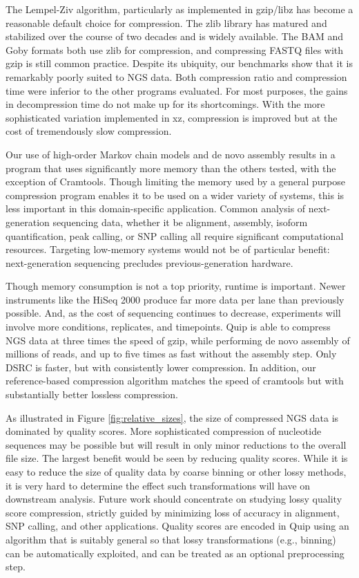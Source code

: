 \documentclass[a4,center,fleqn]{NAR}
\begin{document}
The Lempel-Ziv algorithm, particularly as implemented in gzip/libz has become
a reasonable default choice for compression. The zlib library has matured and
stabilized over the course of two decades and is widely available. The BAM and
Goby formats both use zlib for compression, and compressing FASTQ files with
gzip is still common practice. Despite its ubiquity, our benchmarks show that
it is remarkably poorly suited to NGS data. Both compression ratio and
compression time were inferior to the other programs evaluated. For most
purposes, the gains in decompression time do not make up for its shortcomings.
With the more sophisticated variation implemented in xz, compression is improved
but at the cost of tremendously slow compression.

Our use of high-order Markov chain models and de novo assembly results in a
program that uses significantly more memory than the others tested, with the
exception of Cramtools. Though limiting the memory used by a general purpose
compression program enables it to be used on a wider variety of systems, this
is less important in this domain-specific application. Common analysis of
next-generation sequencing data, whether it be alignment, assembly, isoform
quantification, peak calling, or SNP calling all require significant
computational resources. Targeting low-memory systems would not be of
particular benefit: next-generation sequencing precludes previous-generation
hardware.

Though memory consumption is not a top priority, runtime is important. Newer
instruments like the HiSeq 2000 produce far more data per lane than previously
possible. And, as the cost of sequencing continues to decrease, experiments
will involve more conditions, replicates, and timepoints.  Quip is able to
compress NGS data at three times the speed of gzip, while performing de novo
assembly of millions of reads, and up to five times as fast without the
assembly step. Only DSRC is faster, but with consistently lower compression.
In addition, our reference-based compression algorithm matches the speed
of cramtools but with substantially better lossless compression.

As illustrated in Figure \ref{fig:relative_sizes}, the size of compressed NGS
data is dominated by quality scores. More sophisticated compression of
nucleotide sequences may be possible but will result in only minor reductions
to the overall file size. The largest benefit would be seen by reducing
quality scores. While it is easy to reduce the size of quality data by coarse
binning or other lossy methods, it is very hard to determine the effect such
transformations will have on downstream analysis. Future work should
concentrate on studying lossy quality score compression, strictly guided by
minimizing loss of accuracy in alignment, SNP calling, and other applications.
Quality scores are encoded in Quip using an algorithm that is suitably
general so that lossy transformations (e.g., binning) can be automatically
exploited, and can be treated as an optional preprocessing step.
\end{document}
